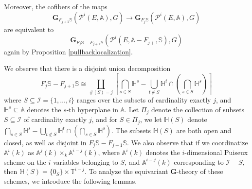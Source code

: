 \documentclass[11pt]{article}
\newcommand\mb{\mathbb}
\newcommand\mc{\mathcal}
\newcommand\mfk{\mathbf G}
\begin{document}
Moreover, the cofibers of the maps  
$$ \mfk_{F_{j+1} \mb{S}}(\mc{P}^i(E,\mb{A}), G) \rightarrow \mfk_{F_j \mb{S}}(\mc{P}^i(E,\mb{A}), G)
$$
are equivalent to 
\begin{equation} \label{beginning} \mfk_{F_j\mb{S}  -F_{j+1}\mb{S} }(\mc{P}^i(E,{\mb{A}-F_{j+1}\mb{S}}), G) \end{equation}
again by Proposition \ref{pullbacklocalization}. 

 We observe that there is a disjoint union decomposition 
\begin{equation} \label{subsets1}
F_j \mb{S} - F_{j+1}\mb{S} \cong  \coprod _{\#(S) = j}\left[ \bigcap _{s \in S} {\mathbb{H}}^s-\bigcup_{t \notin S}{\mb{H}}^t \cap (\bigcap_{s \in S}{\mb{H}}^s) \right]
\end{equation}
where $S \subseteq \mc{I} = \{ 1, \ldots , i \}$ ranges over the subsets of cardinality exactly $j$, and  $\mb{H}^s \subseteq \mb{A}$ denotes the $s$-th hyperplane in $\mb{A}$. Let $\Pi_j$ denote the collection of subsets $S \subseteq \mc{I}$ of cardinality exactly $j $, and for $S \in \Pi_j$, we let $\mb{H}(S)$ denote $\bigcap _{s \in S} {\mathbb{H}}^s-\bigcup_{t \notin S}{\mb{H}}^t \cap (\bigcap_{s \in S}{\mb{H}}^s) $.  The subsets $\mb{H}(S)$ are both open and closed,  as well as disjoint in $F_j \mb{S} - F_{j+1}\mb{S}$. We also observe  that  if we coordinatize  $\mb{A}^i(k)$ as $\mb{A} ^j(k)  \times _k \mb{A} ^{i-j}(k ) $, where $\mb{A}^i(k) $ denotes the $i$-dimensional Puiseux scheme on the $i$ variables belonging to $S$, and $\mb{A}^{i-j}(k) $ corresponding to  $\mc{I}-S$, then $\mb{H}(S) = \{ 0_S \}  \times \mb{T}^{i-j}$.  
 To analyze the equivariant $\mfk$-theory of these schemes, we introduce the following lemmas.  
\end{document}
